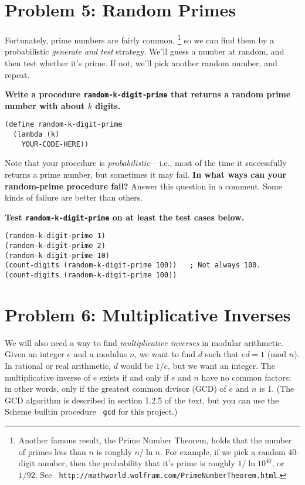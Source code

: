 \section*{Problem 5: Random Primes}


Fortunately, prime numbers are fairly
common,%
\footnote{Another famous result, the Prime Number Theorem, holds
  that the number of primes less than $n$ is roughly $n/\ln n$.  For
  example, if we pick a random 40-digit number, then the probability
  that it's prime is roughly $1/\ln 10^{40}$, or $1/92$.  See {\tt
    http://mathworld.wolfram.com/PrimeNumberTheorem.html}.}
so we can find them by a probabilistic {\it generate and test}
strategy. We'll guess a number at random, and then test whether it's 
prime.  If not, we'll pick another random number, and repeat.

{\bf Write a procedure {\tt random-k-digit-prime} that returns a random prime
  number with about $k$ digits.}  

\begin{verbatim}
(define random-k-digit-prime
  (lambda (k)
    YOUR-CODE-HERE))
\end{verbatim}

Note that your procedure is {\it probabilistic} -- i.e., most of the
time it successfully returns a prime number, but sometimes it may
fail.  {\bf In what ways can your random-prime procedure fail?}
Answer this question in a comment. Some kinds of failure are better
than others.

{\bf Test {\tt random-k-digit-prime} on at least the test cases below.}

\begin{verbatim}
(random-k-digit-prime 1)
(random-k-digit-prime 2)    
(random-k-digit-prime 10)
(count-digits (random-k-digit-prime 100))   ; Not always 100.
(count-digits (random-k-digit-prime 100))
\end{verbatim}

\section*{Problem 6: Multiplicative Inverses}

We will also need a way to find {\it multiplicative inverses} in
modular arithmetic.  Given an integer $e$ and a modulus $n$, we want
to find $d$ such that $ed = 1 $ (mod $n$).  In rational or real
arithmetic, $d$ would be $1/e$, but we want an integer.  The
multiplicative inverse of $e$ exists if and only if $e$ and $n$ have
no common factors; in other words, only if the greatest common divisor
(GCD) of $e$ and $n$ is 1.  (The GCD algorithm is described in section
1.2.5 of the text, but you can use the Scheme builtin procedure {\tt
gcd} for this project.)

